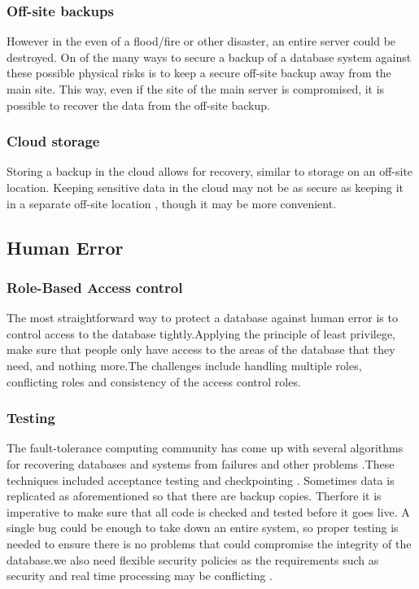 \documentclass[11pt, twocolumn]{article}
\begin{document}
\subsubsection{Off-site backups}
However in the even of a flood/fire or other disaster, an entire server could be destroyed. On of the many ways to secure a backup of a database system against these possible physical risks is to keep a secure off-site backup away from the main site. This way, even if the site of the main server is compromised, it is possible to recover the data from the off-site backup.

\subsubsection{Cloud storage}
Storing a backup in the cloud allows for recovery, similar to storage on an off-site location. Keeping sensitive data in the cloud may not be as secure as keeping it in a separate off-site location \cite{cloud}, though it may be more convenient.

\subsection{Human Error}
\subsubsection{Role-Based Access control}
The most straightforward way to protect a database against human error is to control access to the database tightly.Applying the principle of least privilege, make sure that people only have access to the areas of the database that they need, and nothing more.The challenges include handling multiple roles, conflicting roles and consistency of the access control roles.

\subsubsection{Testing}
The fault-tolerance computing community has come up with several algorithms for recovering databases and systems from failures and other problems .These techniques included acceptance testing and checkpointing \cite{Thur}. Sometimes data is replicated as aforementioned so that there are backup copies. Therfore it is imperative to make sure that all code is checked and tested before it goes live. A single bug could be enough to take down an entire system, so proper testing is needed to ensure there is no problems that could compromise the integrity of the database.we also need flexible security policies as the requirements such as security and real time processing may be conflicting \cite{Thur}.
\end{document}
